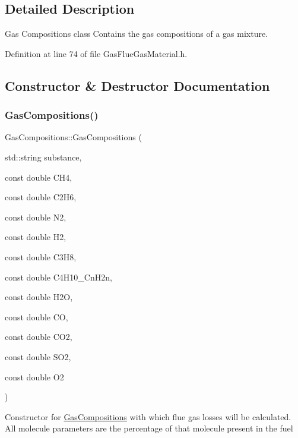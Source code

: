 \subsection{Detailed Description}
Gas Compositions class Contains the gas compositions of a gas mixture. 

Definition at line 74 of file Gas\+Flue\+Gas\+Material.\+h.



\subsection{Constructor \& Destructor Documentation}
\mbox{\label{class_gas_compositions_ad0021d4285883374f8904f9465e41920}} 
\subsubsection{\texorpdfstring{Gas\+Compositions()}{GasCompositions()}\hspace{0.1cm}{\footnotesize\ttfamily [1/3]}}
{\footnotesize\ttfamily Gas\+Compositions\+::\+Gas\+Compositions (\begin{DoxyParamCaption}\item[{std\+::string}]{substance,  }\item[{const double}]{C\+H4,  }\item[{const double}]{C2\+H6,  }\item[{const double}]{N2,  }\item[{const double}]{H2,  }\item[{const double}]{C3\+H8,  }\item[{const double}]{C4\+H10\+\_\+\+Cn\+H2n,  }\item[{const double}]{H2O,  }\item[{const double}]{CO,  }\item[{const double}]{C\+O2,  }\item[{const double}]{S\+O2,  }\item[{const double}]{O2 }\end{DoxyParamCaption})\hspace{0.3cm}{\ttfamily [inline]}}

Constructor for \hyperlink{class_gas_compositions}{Gas\+Compositions} with which flue gas losses will be calculated. All molecule parameters are the percentage of that molecule present in the fuel



